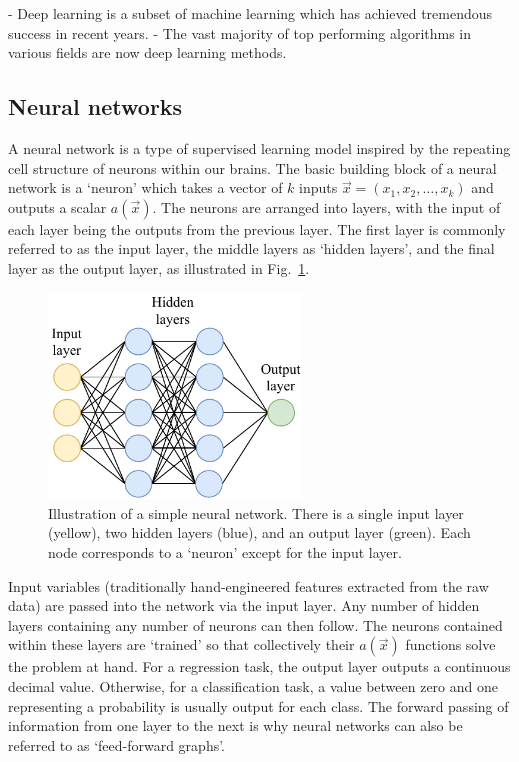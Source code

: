 - Deep learning is a subset of machine learning which has achieved tremendous success in recent
years.
- The vast majority of top performing algorithms in various fields are now deep learning methods.

\subsection{Neural networks} %
\label{sec:cvn_theory_basic} %

A neural network is a type of supervised learning model inspired by the repeating cell structure
of neurons within our brains. The basic building block of a neural network is a `neuron' which
takes a vector of $k$ inputs $\vec{x} = (x_{1}, x_{2},\dots,x_{k})$ and outputs a scalar
$a(\vec{x})$. The neurons are arranged into layers, with the input of each layer being the outputs
from the previous layer. The first layer is commonly referred to as the input layer, the middle
layers as `hidden layers', and the final layer as the output layer, as illustrated in
Fig.~\ref{fig:network}.

\begin{figure} %
    \includegraphics[width=0.6\textwidth]{diagrams/7-cvn/network.pdf}
    \caption[Illustration of a simple neural network]
    {Illustration of a simple neural network. There is a single input layer (yellow), two hidden
        layers (blue), and an output layer (green). Each node corresponds to a `neuron' except for
        the input layer.}
    \label{fig:network}
\end{figure}

Input variables (traditionally hand-engineered features extracted from the raw data) are passed
into the network via the input layer. Any number of hidden layers containing any number of neurons
can then follow. The neurons contained within these layers are `trained' so that collectively
their $a(\vec{x})$ functions solve the problem at hand. For a regression task, the output layer
outputs a continuous decimal value. Otherwise, for a classification task, a value between zero and
one representing a probability is usually output for each class. The forward passing of
information from one layer to the next is why neural networks can also be referred to as
`feed-forward graphs'.

